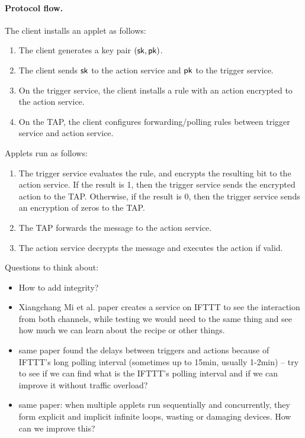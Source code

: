 \paragraph{Protocol flow.}
The client installs an applet as follows:
\begin{enumerate}[leftmargin=*]
\item The client generates a key pair $(\mathsf{sk}, \mathsf{pk})$.
\item The client sends $\mathsf{sk}$ to the action service and $\mathsf{pk}$ to the trigger
  service.
\item On the trigger service, the client installs a rule with an action
  encrypted to the action service.
\item On the TAP, the client configures forwarding/polling rules between trigger
  service and action service.
\end{enumerate}
Applets run as follows:
\begin{enumerate}[leftmargin=*]
\item The trigger service evaluates the rule, and encrypts the resulting bit to
  the action service. If the result is 1, then the trigger service sends the
  encrypted action to the TAP. Otherwise, if the result is 0, then the trigger
  service sends an encryption of zeros to the TAP.
\item The TAP forwards the message to the action service.
\item The action service decrypts the message and executes the action if valid.
\end{enumerate}

\bigskip
Questions to think about:
\begin{itemize}[leftmargin=*]
\item How to add integrity?
\item Xiangchang Mi et al. paper creates a service on IFTTT to see the interaction from both channels,
while testing we would need to the same thing and see how much we can learn about the recipe or
other things.
\item same paper found the delays between triggers and actions because of IFTTT's long polling interval (sometimes up to 15min, usually 1-2min) -- try to see if we can find what is the IFTTT's polling interval and if we can improve it without traffic overload?
\item same paper: when multiple applets run sequentially and concurrently, they form explicit and implicit infinite loops, wasting or damaging devices. How can we improve this?
\end{itemize}


